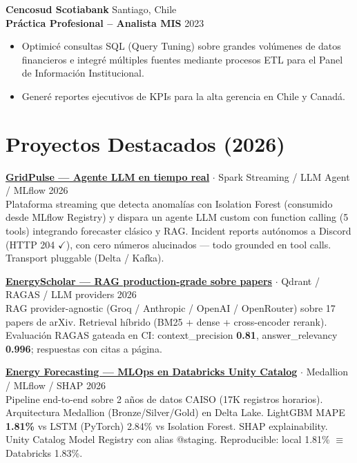 \documentclass[a4paper,10pt]{article}
\newcommand{\entryspace}{\vspace{5pt}}
\begin{document}
\entryspace

\textbf{Cencosud Scotiabank} \hfill Santiago, Chile \\
\textbf{Práctica Profesional -- Analista MIS} \hfill 2023
\begin{itemize}
    \item Optimicé consultas SQL (Query Tuning) sobre grandes volúmenes de datos financieros e integré múltiples fuentes mediante procesos ETL para el Panel de Información Institucional.
    \item Generé reportes ejecutivos de KPIs para la alta gerencia en Chile y Canadá.
\end{itemize}

\section*{Proyectos Destacados (2026)}

\textbf{\href{https://github.com/jsanchez-ds/gridpulse-realtime-agent}{GridPulse --- Agente LLM en tiempo real}} $\cdot$ Spark Streaming / LLM Agent / MLflow \hfill 2026 \\
Plataforma streaming que detecta anomalías con Isolation Forest (consumido desde MLflow Registry) y dispara un agente LLM custom con function calling (5 tools) integrando forecaster clásico y RAG. Incident reports autónomos a Discord (HTTP 204 $\checkmark$), con cero números alucinados --- todo grounded en tool calls. Transport pluggable (Delta / Kafka).

\entryspace

\textbf{\href{https://github.com/jsanchez-ds/energyscholar-rag}{EnergyScholar --- RAG production-grade sobre papers}} $\cdot$ Qdrant / RAGAS / LLM providers \hfill 2026 \\
RAG provider-agnostic (Groq / Anthropic / OpenAI / OpenRouter) sobre 17 papers de arXiv. Retrieval híbrido (BM25 + dense + cross-encoder rerank). Evaluación RAGAS gateada en CI: context\_precision \textbf{0.81}, answer\_relevancy \textbf{0.996}; respuestas con citas a página.

\entryspace

\textbf{\href{https://github.com/jsanchez-ds/energy-forecasting-databricks}{Energy Forecasting --- MLOps en Databricks Unity Catalog}} $\cdot$ Medallion / MLflow / SHAP \hfill 2026 \\
Pipeline end-to-end sobre 2 años de datos CAISO (17K registros horarios). Arquitectura Medallion (Bronze/Silver/Gold) en Delta Lake. LightGBM MAPE \textbf{1.81\%} vs LSTM (PyTorch) 2.84\% vs Isolation Forest. SHAP explainability. Unity Catalog Model Registry con alias @staging. Reproducible: local 1.81\% $\equiv$ Databricks 1.83\%.
\end{document}
